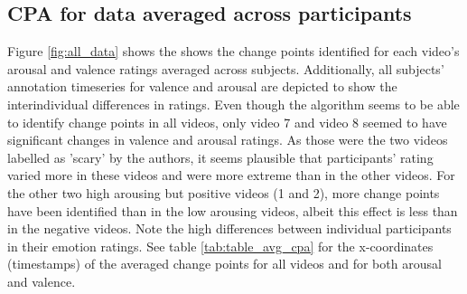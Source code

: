 \documentclass[11pt, letterpaper]{article}
\begin{document}
\newpage

\subsection{CPA for data averaged across participants}
Figure \ref{fig:all_data} shows the shows the change points identified for each video's arousal and valence ratings averaged across subjects. Additionally, all subjects' annotation timeseries for valence and arousal are depicted to show the interindividual differences in ratings. Even though the algorithm seems to be able to identify change points in all videos, only video 7 and video 8 seemed to have significant changes in valence and arousal ratings. As those were the two videos labelled as 'scary' by the authors, it seems plausible that participants' rating varied more in these videos and were more extreme than in the other videos. For the other two high arousing but positive videos (1 and 2), more change points have been identified than in the low arousing videos, albeit this effect is less than in the negative videos. Note the high differences between individual participants in their emotion ratings.
See table \ref{tab:table_avg_cpa} for the x-coordinates (timestamps) of the averaged change points for all videos and for both arousal and valence.
\end{document}
